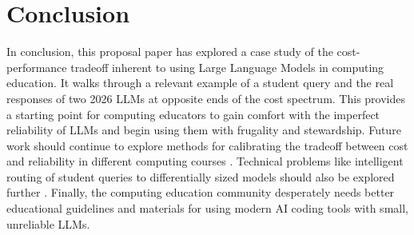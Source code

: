 \section{Conclusion}\label{conclusion}

In conclusion, this proposal paper has explored a case study of the cost-performance tradeoff inherent to using Large Language Models in computing education. It walks through a relevant example of a student query and the real responses of two 2026 LLMs at opposite ends of the cost spectrum. This provides a starting point for computing educators to gain comfort with the imperfect reliability of LLMs and begin using them with frugality and stewardship. Future work should continue to explore methods for calibrating the tradeoff between cost and reliability in different computing courses \cite{jimenezrodriguezPersonalizedCodingProblem2026}. Technical problems like intelligent routing of student queries to differentially sized models should also be explored further \cite{dingHybridLlmCostefficient2024,moslemDynamicModelRouting2026,tanejaAgenticRAGPersonalized2025}. Finally, the computing education community desperately needs better educational guidelines and materials for using modern AI coding tools with small, unreliable LLMs.